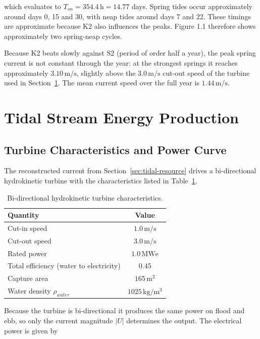 which evaluates to $T_{sn} = 354.4\,\mathrm{h} = 14.77$ days. Spring tides occur approximately around days 0, 15 and 30, with neap tides around days 7 and 22. These timings are approximate because K2 also influences the peaks. Figure 1.1 therefore shows approximately two spring-neap cycles.

Because K2 beats slowly against S2 (period of order half a year), the peak spring current is not constant through the year: at the strongest springs it reaches approximately $3.10\,\mathrm{m/s}$, slightly above the $3.0\,\mathrm{m/s}$ cut-out speed of the turbine used in Section~\ref{sec:tidal-stream}. The mean current speed over the full year is $1.44\,\mathrm{m/s}$.

\section{Tidal Stream Energy Production}
\label{sec:tidal-stream}

\subsection{Turbine Characteristics and Power Curve}
\label{sec:stream-turbine}
The reconstructed current from Section~\ref{sec:tidal-resource} drives a bi-directional hydrokinetic turbine with the characteristics listed in Table~\ref{tab:stream-turbine}.

\begin{table}[H]
    \centering
    \caption{Bi-directional hydrokinetic turbine characteristics.}
    \label{tab:stream-turbine}
    \begin{tabular}{lc}
        \hline
        Quantity & Value \\
        \hline
        Cut-in speed & $1.0\,\mathrm{m/s}$ \\
        Cut-out speed & $3.0\,\mathrm{m/s}$ \\
        Rated power & $1.0\,\mathrm{MWe}$ \\
        Total efficiency (water to electricity) & $0.45$ \\
        Capture area & $165\,\mathrm{m^2}$ \\
        Water density $\rho_{water}$ & $1025\,\mathrm{kg/m^3}$ \\
        \hline
    \end{tabular}
\end{table}

Because the turbine is bi-directional it produces the same power on flood and ebb, so only the current magnitude $|U|$ determines the output. The electrical power is given by

